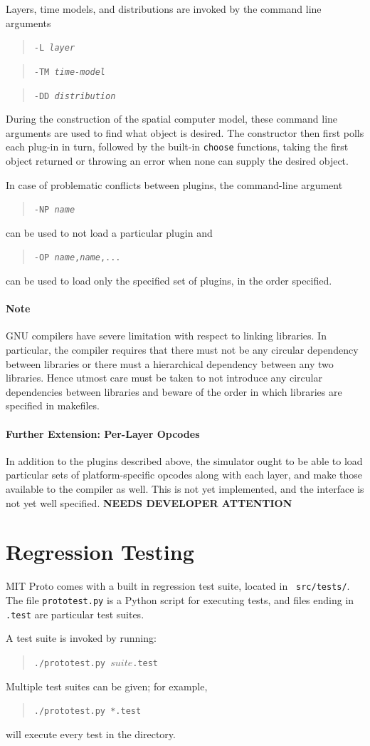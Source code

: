\documentclass{article}
\newcommand\fixme{{\bf NEEDS DEVELOPER ATTENTION}}
\newcommand\code[1]{\begin{quote}\var{#1}\end{quote}}
\newcommand\var[1]{{\tt #1}}
\begin{document}
Layers, time models, and distributions are invoked by the command line
arguments \code{-L {\it layer}} \code{-TM {\it time-model}} \code{-DD
  {\it distribution}}  

During the construction of the spatial computer model, these command
line arguments are used to find what object is desired.  The
constructor then first polls each plug-in in turn, followed by the
built-in \var{choose} functions, taking the first object returned or
throwing an error when none can supply the desired object.

In case of problematic conflicts between plugins, the command-line
argument \code{-NP {\it name}} can be used to not load a particular
plugin and \code{-OP {\it name},{\it name},...} can be used to load
only the specified set of plugins, in the order specified.

\paragraph{Note}
GNU compilers have severe limitation with respect to linking libraries. 
In particular, the compiler requires that there must not be any circular dependency 
between libraries or there must a hierarchical dependency between any two libraries.
Hence utmost care must be taken to not introduce any circular dependencies between libraries
and beware of the order in which libraries are specified in makefiles.

\paragraph{Further Extension: Per-Layer Opcodes}

In addition to the plugins described above, the simulator ought to be
able to load particular sets of platform-specific opcodes along with
each layer, and make those available to the compiler as well.  This
is not yet implemented, and the interface is not yet well specified.
\fixme{}


\section{Regression Testing}

MIT Proto comes with a built in regression test suite, located in {\tt
  src/tests/}.  The file {\tt prototest.py} is a Python script for
executing tests, and files ending in {\tt .test} are particular test suites.

A test suite is invoked by running: \code{./prototest.py $suite$.test}
Multiple test suites can be given; for example, \code{./prototest.py
  *.test} will execute every test in the directory.
\end{document}
